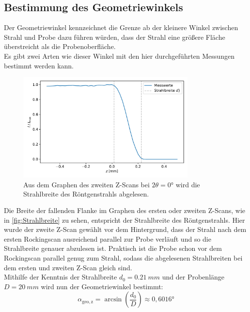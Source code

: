 \newpage
\subsection{Bestimmung des Geometriewinkels}
\label{sec:BestimmungGeometriewinkel}
    Der Geometriewinkel kennzeichnet die Grenze ab der kleinere Winkel zwischen Strahl und Probe dazu führen würden, dass der Strahl eine größere Fläche überstreicht als die Probenoberfläche. \\
    Es gibt zwei Arten wie dieser Winkel mit den hier durchgeführten Messungen bestimmt werden kann.

    \begin{figure}[ht]
        \centering
        \includegraphics[width = 0.8\textwidth]{plots/Strahlbreite.pdf}
        \caption{Aus dem Graphen des zweiten Z-Scans bei $2\theta = 0°$ wird die Strahlbreite des Röntgenstrahls abgelesen.}
        \label{fig:Strahlbreite}
    \end{figure}
    Die Breite der fallenden Flanke im Graphen des ersten oder zweiten Z-Scans, wie in \autoref{fig:Strahlbreite} zu sehen, entspricht der Strahlbreite des Röntgenstrahls.
    Hier wurde der zweite Z-Scan gewählt vor dem Hintergrund, dass der Strahl nach dem ersten Rockingscan ausreichend parallel zur Probe verläuft und so die Strahlbreite genauer abzulesen ist.
    Praktisch ist die Probe schon vor dem Rockingscan parallel genug zum Strahl, sodass die abgelesenen Strahlbreiten bei dem ersten und zweiten Z-Scan gleich sind. \\
    Mithilfe der Kenntnis der Strahlbreite $d_0 = \SI{0,21}{mm}$ und der Probenlänge $D = \SI{20}{mm}$ wird nun der Geometriewinkel bestimmt:
    \begin{equation*}
        \alpha_{\mathrm{geo,z}} = \arcsin\left(\frac{d_0}{D}\right) \approx 0,6016°
    \end{equation*}
    
